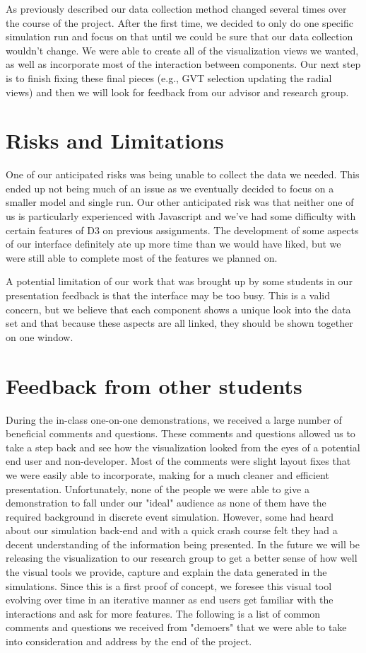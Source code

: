 \documentclass{acm_proc_article-sp}
\begin{document}
As previously described our data collection method changed several times over the course of the project.  After the first time, we decided to only do one specific simulation run and focus on that until we could be sure that our data collection wouldn't change.  We were able to create all of the visualization views we wanted, as well as incorporate most of the interaction between components.    Our next step is to finish fixing these final pieces (e.g., GVT selection updating the radial views) and then we will look for feedback from our advisor and research group.  

\section{Risks and Limitations}
One of our anticipated risks was being unable to collect the data we needed.  This ended up not being much of an issue as we eventually decided to focus on a smaller model and single run.  Our other anticipated risk was that neither one of us is particularly experienced with Javascript and we've had some difficulty with certain features of D3 on previous assignments.   The development of some aspects of our interface definitely ate up more time than we would have liked, but we were still able to complete most of the features we planned on.  

A potential limitation of our work that was brought up by some students in our presentation feedback is that the interface may be too busy.  This is a valid concern, but we believe that each component shows a unique look into the data set and that because these aspects are all linked, they should be shown together on one window. 
    

\section{Feedback from other students}
During the in-class one-on-one demonstrations, we received a large number of beneficial comments and questions. These comments and questions allowed us to take a step back and see how the visualization looked from the eyes of a potential end user and non-developer. Most of the comments were slight layout fixes that we were easily able to incorporate, making for a much cleaner and efficient presentation. Unfortunately, none of the people we were able to give a demonstration to fall under our "ideal" audience as none of them have the required background in discrete event simulation. However, some had heard about our simulation back-end and with a quick crash course felt they had a decent understanding of the information being presented. In the future we will be releasing the visualization to our research group to get a better sense of how well the visual tools we provide, capture and explain the data generated in the simulations. Since this is a first proof of concept, we foresee this visual tool evolving over time in an iterative manner as end users get familiar with the interactions and ask for more features. The following is a list of common comments and questions we received from "demoers" that we were able to take into consideration and address by the end of the project. 
\end{document}
